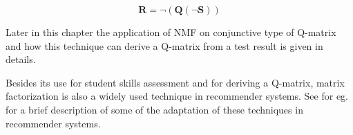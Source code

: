 \begin{equation}
\mathbf{R}=\neg\left(\mathbf{Q}\left(\neg\mathbf{S}\right)\right)\label{eq:6}
\end{equation}

Later in this chapter the application of NMF on conjunctive type of Q-matrix and how this technique can derive a Q-matrix from a test result is given in details.

Besides its use for student skills assessment and for deriving a Q-matrix, matrix factorization is also a widely used technique in recommender systems. See for eg. \citet{koren2009matrix}  for a brief description of some of the adaptation of these techniques in recommender systems. 







